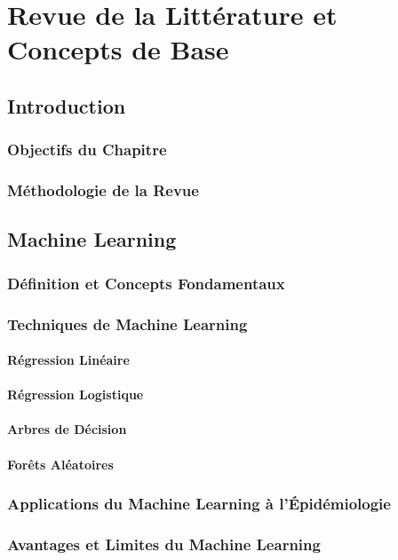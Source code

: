 \chapter{Revue de la Littérature et Concepts de Base}

\section{Introduction}
\subsection{Objectifs du Chapitre}
\subsection{Méthodologie de la Revue}

\section{Machine Learning}
\subsection{Définition et Concepts Fondamentaux}
\subsection{Techniques de Machine Learning}
\subsubsection{Régression Linéaire}
\subsubsection{Régression Logistique}
\subsubsection{Arbres de Décision}
\subsubsection{Forêts Aléatoires}
\subsection{Applications du Machine Learning à l'Épidémiologie}
\subsection{Avantages et Limites du Machine Learning}

